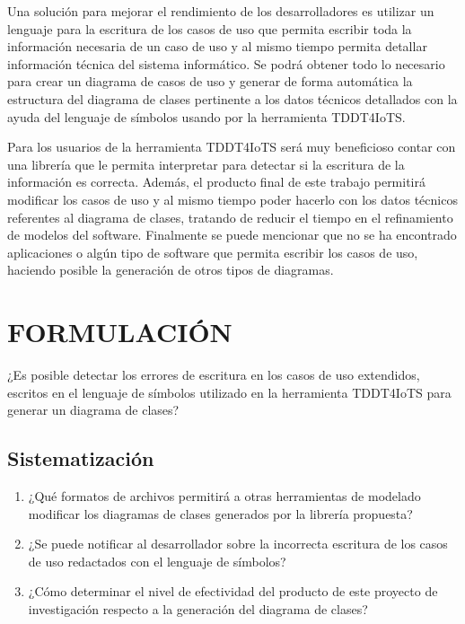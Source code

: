 \documentclass[12pt,a4paper,final, xcolor=table, table]{article}
\begin{document}
	Una solución para mejorar el rendimiento de los desarrolladores es utilizar un lenguaje para la escritura de los casos de uso que permita escribir toda la información necesaria de un caso de uso y al mismo tiempo permita detallar información técnica del sistema informático. Se podrá obtener todo lo necesario para crear un diagrama de casos de uso y generar de forma automática la estructura del diagrama de clases pertinente a los datos técnicos detallados con la ayuda del lenguaje de símbolos usando por la herramienta TDDT4IoTS. 
	
	Para los usuarios de la herramienta TDDT4IoTS será muy beneficioso contar con una librería que le permita interpretar para detectar si la escritura de la información es correcta. Además, el producto final de este trabajo permitirá modificar los casos de uso y al mismo tiempo poder hacerlo con los datos técnicos referentes al diagrama de clases, tratando de reducir el tiempo en el refinamiento de modelos del software. Finalmente se puede mencionar que no se ha encontrado aplicaciones o algún tipo de software que permita escribir los casos de uso, haciendo posible la generación de otros tipos de diagramas.
	
	
	\section{FORMULACIÓN}
	
	¿Es posible detectar los errores de escritura en los casos de uso extendidos, escritos en el lenguaje de símbolos utilizado en la herramienta TDDT4IoTS para generar un diagrama de clases?
	
	\subsection{Sistematización}
	
	\begin{enumerate}
		\item ¿Qué formatos de archivos permitirá a otras herramientas de modelado modificar los diagramas de clases generados por la librería propuesta?
		
		\item ¿Se puede notificar al desarrollador sobre la incorrecta escritura de los casos de uso redactados con el lenguaje de símbolos?
		
		\item ¿Cómo determinar el nivel de efectividad del producto de este proyecto de investigación respecto a la generación del diagrama de clases?
	\end{enumerate}
	
\end{document}
